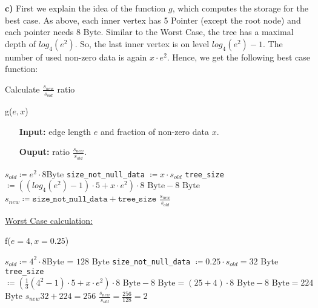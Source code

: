 \documentclass[english, fontsize=12pt, paper=a4, twoside=false, draft=true, pagesize=auto, version=last, DIV=16]{scrartcl}
\theoremstyle{break}
\begin{document}
\textbf{c)}
First we explain the idea of the function $g$, which computes the storage for the best case. As above, each inner vertex has 5 Pointer (except the root node) and each pointer needs $8 \text{ Byte}$. Similar to the Worst Case, the tree has a maximal depth of $log_4(e^2)$. So, the last inner vertex is on level $log_4(e^2) - 1$. The number of used non-zero data is again $x \cdot e^2$. Hence, we get the following best case function: \par
\newpage
\begin{algorithm}
\caption{Calculate $\frac{s_{new}}{s_{old}}$ ratio}
\label{Alg f} \par
\medskip
{g($e, x$)} \par
\vspace*{-3mm}
\begin{itemize}[leftmargin=20mm]
\item[\textbf{Input:}] edge length $e$ and fraction of non-zero data $x$. \\[-20pt]
\item[\textbf{Ouput:}] ratio $\frac{s_{new}}{s_{old}}$.
\end{itemize} \par
\vspace*{-3mm}
\begin{algorithmic}[1]
	\State $s_{old} \coloneqq e^2 \cdot 8$Byte
	\State \texttt{size\_not\_null\_data} $\coloneqq x \cdot s_{old}$
	\State \texttt{tree\_size} $\coloneqq \left( (log_4(e^2) - 1) \cdot 5 + x \cdot e^2 \right) \cdot 8 \text{ Byte} - 8 \text{ Byte}$
	\State $s_{new} \coloneqq \texttt{size\_not\_null\_data} + \texttt{tree\_size}$ 
   	\State \Return $\frac{s_{new}}{s_{old}}$
\end{algorithmic}
\end{algorithm}\par
\vspace*{5mm}

\underline{Worst Case calculation:} \par
\vspace*{-3mm}
\begin{algorithm}
{f($e=4, x=0.25$)} \par
\begin{algorithmic}[1]
	\State $s_{old} \coloneqq 4^2 \cdot 8$Byte = $128$ Byte
	\State \texttt{size\_not\_null\_data} $\coloneqq 0.25 \cdot s_{old} = 32$ Byte
	\State \texttt{tree\_size} $\coloneqq \left(\frac{1}{3}\left( 4^2 - 1 \right) \cdot 5 + x \cdot e^2 \right) \cdot 8 \text{ Byte} - 8 \text{ Byte} = (25 + 4) \cdot 8 \text{ Byte} - 8 \text{ Byte} = 224$ Byte
	\State $s_{new} 32 + 224 = 256$ 
   	\State \Return $\frac{s_{new}}{s_{old}} = \frac{256}{128} = 2$
\end{algorithmic}
\end{algorithm}\par
\vspace*{3mm}
\end{document}
